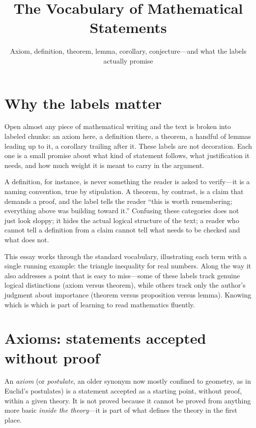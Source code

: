 \documentclass{essay}
\title{The Vocabulary of Mathematical Statements}
\subtitle{Axiom, definition, theorem, lemma, corollary, conjecture---and what the labels actually promise}
\author{}
\date{}
\begin{document}
\maketitle

\section{Why the labels matter}

Open almost any piece of mathematical writing and the text is broken into labeled chunks: an axiom here, a definition there, a theorem, a handful of lemmas leading up to it, a corollary trailing after it. These labels are not decoration. Each one is a small promise about what kind of statement follows, what justification it needs, and how much weight it is meant to carry in the argument.

A definition, for instance, is never something the reader is asked to verify---it is a naming convention, true by stipulation. A theorem, by contrast, is a claim that demands a proof, and the label tells the reader ``this is worth remembering; everything above was building toward it.'' Confusing these categories does not just look sloppy; it hides the actual logical structure of the text; a reader who cannot tell a definition from a claim cannot tell what needs to be checked and what does not.

This essay works through the standard vocabulary, illustrating each term with a single running example: the triangle inequality for real numbers. Along the way it also addresses a point that is easy to miss---some of these labels track genuine logical distinctions (axiom versus theorem), while others track only the author's judgment about importance (theorem versus proposition versus lemma). Knowing which is which is part of learning to read mathematics fluently.

\section{Axioms: statements accepted without proof}

\begin{definition}[Axiom]
An \emph{axiom} (or \emph{postulate}, an older synonym now mostly confined to geometry, as in Euclid's postulates) is a statement accepted as a starting point, without proof, within a given theory. It is not proved because it cannot be proved from anything more basic \emph{inside the theory}---it is part of what defines the theory in the first place.
\end{definition}
\end{document}
